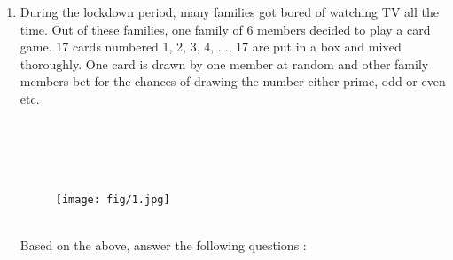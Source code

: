 \documentclass{article}
\begin{document}
	\begin{enumerate}

		\item During the lockdown period, many families got bored of watching TV all the time. Out of these families, one family of 6 members decided to play a card game. 17 cards numbered 1, 2, 3, 4, ..., 17 are put in a box and mixed thoroughly. One card is drawn by one member at random and other family members bet for the chances of drawing the number either prime, odd or even etc. 
		\\
		\\
		\\
		\\
		\\
        \begin{figure}[h!]
          \centering
          \texttt{[image: fig/1.jpg]}
        \end{figure} 
        \\
		Based on the above, answer the following questions : 
		

\end{enumerate}
\end{document}
